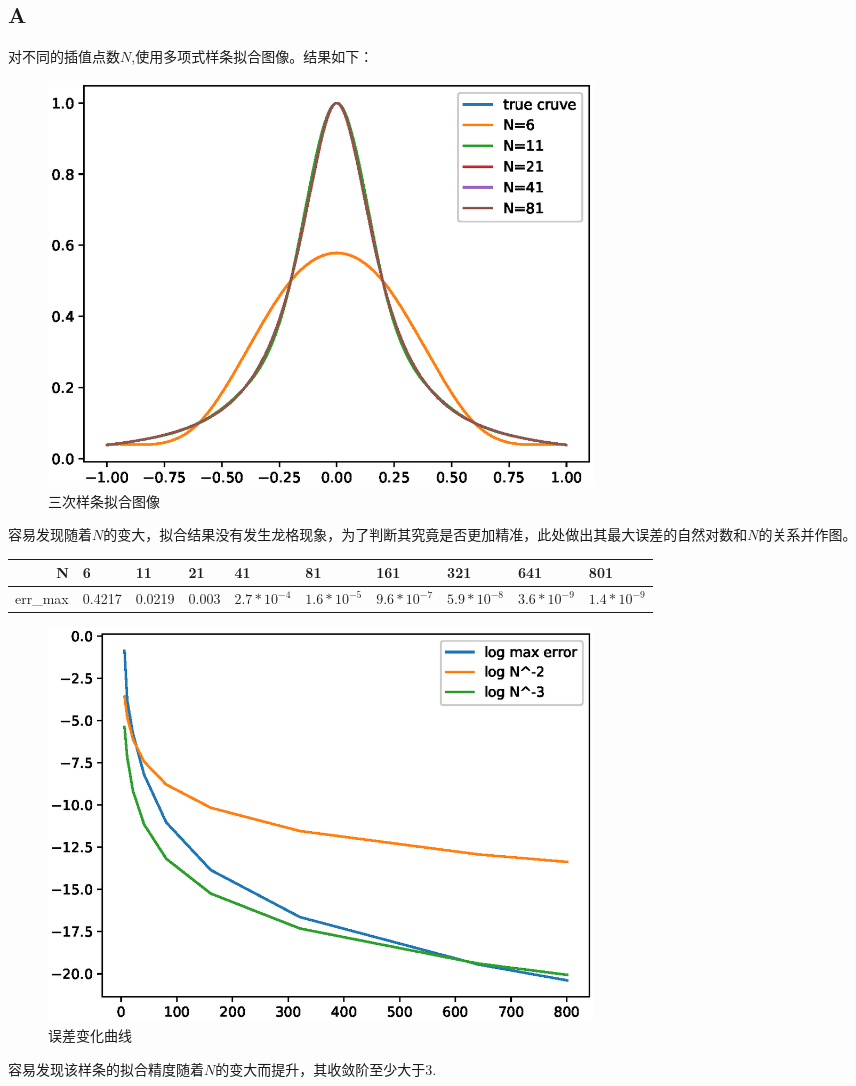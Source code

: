 \documentclass[12]{article}%
\begin{document}
    \subsection{A}
        对不同的插值点数$N$,使用多项式样条拟合图像。结果如下：
        \begin{figure}[H]
            \centering
            \includegraphics[width=0.7\textwidth]{../pic/A.eps}
            \caption{三次样条拟合图像}
        \end{figure}
        容易发现随着$N$的变大，拟合结果没有发生龙格现象，为了判断其究竟是否更加精准，此处做出其最大误差的自然对数和$N$的关系并作图。
        \begin{table}[]
            \begin{tabular}{|l|l|l|l|l|l|l|l|l|l|}
            \hline
            \multicolumn{1}{|r|}{N} & 6      & 11     & 21    & 41            & 81             & 161            & 321            & 641           & 801           \\ \hline
            err\_max                & 0.4217 & 0.0219 & 0.003 & $2.7*10^{-4}$ & $1.6*10^{-5}$ & $9.6*10^{-7}$ & $5.9*10^{-8}$ & $3.6*10^{-9}$ & $1.4*10^{-9}$ \\ \hline
            \end{tabular}
            \end{table}
        \begin{figure}[H]
            \centering
            \includegraphics[width=0.7\textwidth]{../pic/A2.eps}
            \caption{误差变化曲线}
        \end{figure}
        容易发现该样条的拟合精度随着$N$的变大而提升，其收敛阶至少大于3.
    
\end{document}
